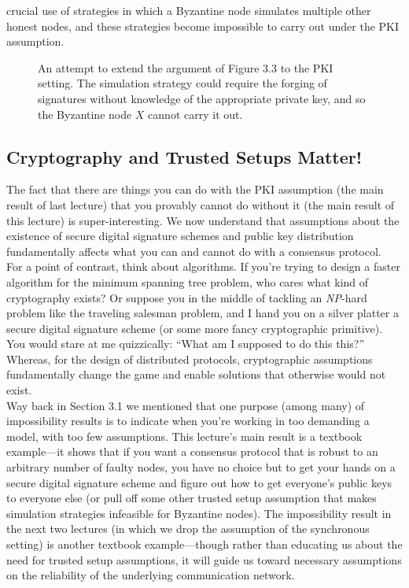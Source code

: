 crucial use of strategies in which a Byzantine node simulates multiple other honest nodes,
and these strategies become impossible to carry out under the PKI assumption.
\begin{figure}[h]
    \centering
    \qquad
    \caption{ An attempt to extend the argument of Figure 3.3 to the PKI setting. The simulation
    strategy could require the forging of signatures without knowledge of the appropriate private
    key, and so the Byzantine node $X$ cannot carry it out.
        }
    \label{fig:example}%
\end{figure}


\subsection{Cryptography and Trusted Setups Matter!}
The fact that there are things you can do with the PKI assumption (the main result of
last lecture) that you provably cannot do without it (the main result of this lecture) is
super-interesting. We now understand that assumptions about the existence of secure digital
signature schemes and public key distribution fundamentally affects what you can and cannot
do with a consensus protocol.\\
For a point of contrast, think about algorithms. If you’re trying to design a faster
algorithm for the minimum spanning tree problem, who cares what kind of cryptography
exists? Or suppose you in the middle of tackling an \textit{NP}-hard problem like the traveling
salesman problem, and I hand you on a silver platter a secure digital signature scheme (or
some more fancy cryptographic primitive). You would stare at me quizzically: “What am I
supposed to do this this?” Whereas, for the design of distributed protocols, cryptographic
assumptions fundamentally change the game and enable solutions that otherwise would not
exist.\\
Way back in Section 3.1 we mentioned that one purpose (among many) of impossibility
results is to indicate when you’re working in too demanding a model, with too few assumptions. This lecture’s main result is a textbook example—it shows that if you want
a consensus protocol that is robust to an arbitrary number of faulty nodes, you have no
choice but to get your hands on a secure digital signature scheme and figure out how to get
everyone’s public keys to everyone else (or pull off some other trusted setup assumption that
makes simulation strategies infeasible for Byzantine nodes). The impossibility result in the
next two lectures (in which we drop the assumption of the synchronous setting) is another
textbook example—though rather than educating us about the need for trusted setup assumptions, it will guide us toward necessary assumptions on the reliability of the underlying communication network.

